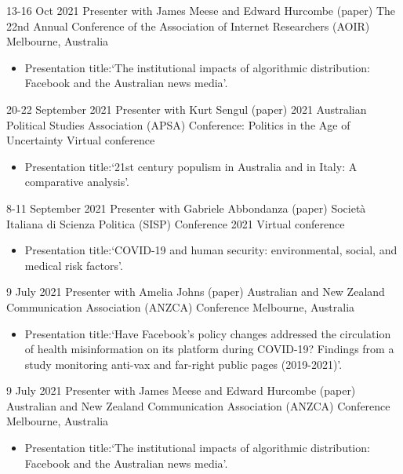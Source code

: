 \documentclass[11pt,a4paper,sans]{moderncv}
\begin{document}
\cventry %
{13-16 Oct 2021}
{Presenter with James Meese and Edward Hurcombe (paper)}
{The 22nd Annual Conference of the Association of Internet Researchers
  (AOIR)}
{Melbourne, Australia}
{}
       {
      \begin{itemize} %
        \item {Presentation title:`The institutional impacts of algorithmic distribution: Facebook and the Australian news media'.}
      \end{itemize}
    }

\cventry %
{20-22 September 2021}
{Presenter with Kurt Sengul (paper)}
{2021 Australian Political Studies Association (APSA) Conference: Politics in the Age of Uncertainty}
{Virtual conference}
{}
       {
      \begin{itemize} %
        \item {Presentation title:`21st century populism in Australia and in Italy: A comparative analysis'.}
      \end{itemize}
    }

 \cventry
    {8-11 September 2021}
    {Presenter with Gabriele Abbondanza (paper)}
    {Società Italiana di Scienza Politica (SISP) Conference 2021}
    {Virtual conference}{}
       {
      \begin{itemize} %
        \item {Presentation title:`COVID-19 and human security: environmental, social, and medical risk factors'.}
      \end{itemize}
    }


\cventry %
{9 July 2021}
{Presenter with Amelia Johns (paper)}
{Australian and New Zealand Communication Association (ANZCA) Conference}
{Melbourne, Australia}
{}
       {
      \begin{itemize} %
        \item {Presentation title:`Have Facebook's policy changes
            addressed the circulation of health misinformation on its
            platform during COVID-19? Findings from a study monitoring
            anti-vax and far-right public pages (2019-2021)'.}
      \end{itemize}
    }

\cventry %
{9 July 2021}
{Presenter with James Meese and Edward Hurcombe (paper)}
{Australian and New Zealand Communication Association (ANZCA) Conference}
{Melbourne, Australia}
{}
       {
      \begin{itemize} %
        \item {Presentation title:`The institutional impacts of algorithmic distribution: Facebook and the Australian news media'.}
      \end{itemize}
    }
\end{document}
